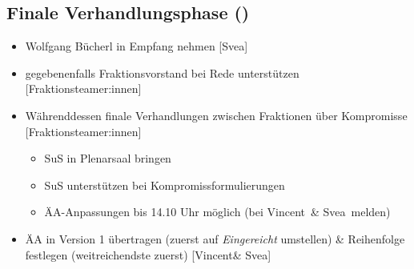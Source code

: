 \documentclass{article}
\newcommand{\KOM}{Svea}
\newcommand{\EP}{Vincent}
\begin{document}
	\subsection{Finale Verhandlungsphase (\timeFinVerh)}
	\begin{itemize}
		\item Wolfgang Bücherl in Empfang nehmen [\KOM]
		\item gegebenenfalls Fraktionsvorstand bei Rede unterstützen [Fraktionsteamer:innen]
		\item Währenddessen finale Verhandlungen zwischen Fraktionen über Kompromisse [Fraktionsteamer:innen]
		\begin{itemize}
			\item SuS in Plenarsaal bringen
			\item SuS unterstützen bei Kompromissformulierungen
			\item ÄA-Anpassungen bis 14.10 Uhr möglich (bei \EP\ \& \KOM\ melden)
		\end{itemize}
		\item ÄA in Version 1 übertragen (zuerst auf \textit{Eingereicht} umstellen) \& Reihenfolge festlegen (weitreichendste zuerst) [\EP \& \KOM]
	\end{itemize}
	
\end{document}
